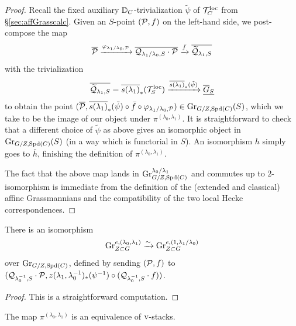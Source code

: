 \begin{proof}
Recall the fixed auxiliary $\mathbb D_{C}$-trivialization $\tilde{\psi}$ of $\mathcal{T}_{C}^{\mathrm{loc}}$ from \S \ref{sec:affGrasscalc}. Given an $S$-point $(\mathcal{P}, f)$ on the left-hand side, we post-compose the map 
   \begin{equation*}
   \overline{\mathcal{P}} \xrightarrow{\varphi_{\lambda_{1}/\lambda_{0},\mathcal{P}}} \overline{\mathcal{Q}_{\lambda_{1}/\lambda_{0},S} \cdot \mathcal{P}} \xrightarrow{\bar{f}} \overline{\widetilde{\mathcal{Q}}_{\lambda_{1},S}}
   \end{equation*}
   with the trivialization
   \begin{equation*}
  \overline{\widetilde{\mathcal{Q}}_{\lambda_{1},S}} = \overline{s(\lambda_{1})}_{*}(\mathcal{T}^{\mathrm{loc}}_{S}) \xrightarrow{\overline{s(\lambda_{1})}_{*}(\tilde{\psi})} \underline{\overline{G}_{S}}
   \end{equation*}
   to obtain the point $(\overline{\mathcal{P}}, \overline{s(\lambda_{1})}_{*}(\tilde{\psi}) \circ \bar{f} \circ \varphi_{\lambda_{1}/\lambda_{0},\mathcal{P}}) \in \textnormal{Gr}_{G/Z,\mathrm{Spd}(C)}(S)$, which we take to be the image of our object under $\pi^{(\lambda_{0},\lambda_{1})}$. It is straightforward to check that a different choice of $\tilde{\psi}$ as above gives an isomorphic object in $\textnormal{Gr}_{G/Z,\mathrm{Spd}(C)}(S)$ (in a way which is functorial in $S$). An isomorphism $h$ simply goes to $\bar{h}$, finishing the definition of $\pi^{(\lambda_{0},\lambda_{1})}$.
   
     The fact that the above map lands in $\textnormal{Gr}_{G/Z,\mathrm{Spd}(C)}^{\lambda_{0}/\lambda_{1}}$ and commutes up to $2$-isomorphism is immediate from the definition of the (extended and classical) affine Grassmannians and the compatibility of the two local Hecke correspondences.
\end{proof}

\begin{lem}\label{lem:Grtwist} There is an isomorphism 
\begin{equation*}
    \textnormal{Gr}^{e,(\lambda_{0},\lambda_{1})}_{Z \subset G} \xrightarrow{\sim} \textnormal{Gr}^{e,(1,\lambda_{1}/\lambda_{0})}_{Z \subset G}
\end{equation*}
over $\textnormal{Gr}_{G/Z,\mathrm{Spd}(C)}$, defined by sending $(\mathcal{P}, f)$ to $(\mathcal{Q}_{\lambda_{0}^{-1},S} \cdot \mathcal{P}, z(\lambda_{1},\lambda_{0}^{-1})_{*}(\psi^{-1}) \circ (\mathcal{Q}_{\lambda_{0}^{-1},S} \cdot f))$. 
\end{lem}
\begin{proof}
    This is a straightforward computation.
\end{proof}

\begin{prop}\label{prop:mainGrisom}
    The map $\pi^{(\lambda_{0},\lambda_{1})}$ is an equivalence of $\textnormal{v}$-stacks. 
\end{prop}

